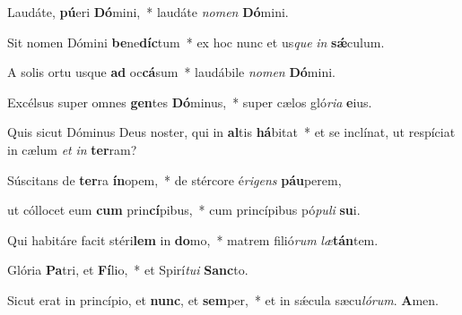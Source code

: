 \item Laudáte, \textbf{pú}eri \textbf{Dó}mini,~* laudáte \textit{nomen} \textbf{Dó}mini.

\item Sit nomen Dómini \textbf{be}ne\textbf{díc}tum~* ex hoc nunc et us\textit{que} \textit{in} \textbf{sǽ}culum.

\item A solis ortu usque \textbf{ad} oc\textbf{cá}sum~* laudábile \textit{nomen} \textbf{Dó}mini.

\item Excélsus super omnes \textbf{gen}tes \textbf{Dó}minus,~* super cælos gló\textit{ria} \textbf{e}ius.

\item Quis sicut Dóminus Deus noster, qui in \textbf{al}tis \textbf{há}bitat~* et se inclínat, ut respíciat in cælum \textit{et} \textit{in} \textbf{ter}ram?

\item Súscitans de \textbf{ter}ra \textbf{ín}opem,~* de stércore é\textit{rigens} \textbf{páu}perem,

\item ut cóllocet eum \textbf{cum} prin\textbf{cí}pibus,~* cum princípibus pó\textit{puli} \textbf{su}i.

\item Qui habitáre facit stéri\textbf{lem} in \textbf{do}mo,~* matrem filió\textit{rum} \textit{læ}\textbf{tán}tem.

\item Glória \textbf{Pa}tri, et \textbf{Fí}lio,~* et Spirí\textit{tui} \textbf{Sanc}to.

\item Sicut erat in princípio, et \textbf{nunc}, et \textbf{sem}per,~* et in sǽcula sæcu\textit{lórum}. \textbf{A}men.
